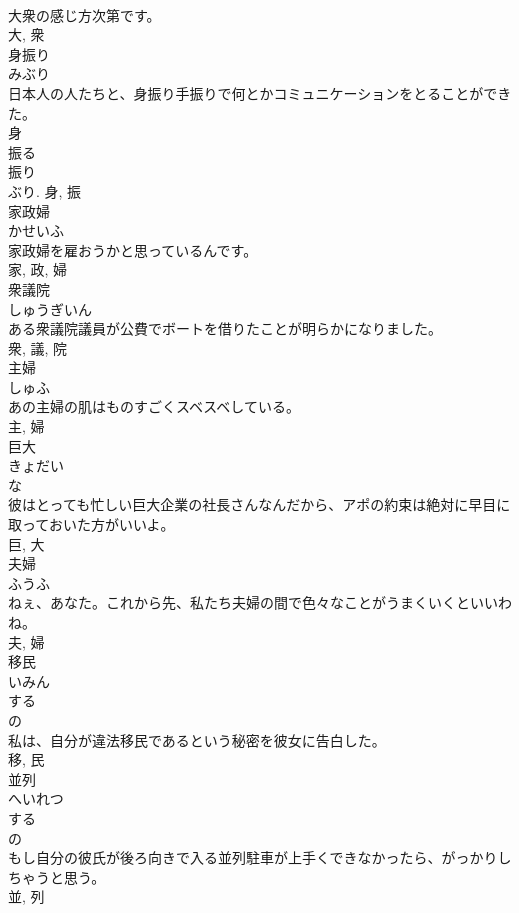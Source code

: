 \documentclass[8pt]{extreport}
\begin{document}
\begin{CJK}{UTF8}{min}
\\	大衆の感じ方次第です。	
\\	大, 衆	
\\	身振り	
\\	みぶり	
\\	日本人の人たちと、身振り手振りで何とかコミュニケーションをとることができた。	
\\	身 
\\	振る 
\\	振り 
\\	ぶり.	身, 振	
\\	家政婦	
\\	かせいふ	
\\	家政婦を雇おうかと思っているんです。	
\\	家, 政, 婦	
\\	衆議院	
\\	しゅうぎいん	
\\	ある衆議院議員が公費でボートを借りたことが明らかになりました。	
\\	衆, 議, 院	
\\	主婦	
\\	しゅふ	
\\	あの主婦の肌はものすごくスベスベしている。	
\\	主, 婦	
\\	巨大	
\\	きょだい	
\\	な 
\\	彼はとっても忙しい巨大企業の社長さんなんだから、アポの約束は絶対に早目に取っておいた方がいいよ。	
\\	巨, 大	
\\	夫婦	
\\	ふうふ	
\\	ねぇ、あなた。これから先、私たち夫婦の間で色々なことがうまくいくといいわね。	
\\	夫, 婦	
\\	移民	
\\	いみん	
\\	する 
\\	の 
\\	私は、自分が違法移民であるという秘密を彼女に告白した。	
\\	移, 民	
\\	並列	
\\	へいれつ	
\\	する 
\\	の 
\\	もし自分の彼氏が後ろ向きで入る並列駐車が上手くできなかったら、がっかりしちゃうと思う。	
\\	並, 列	

\end{CJK}
\end{document}
